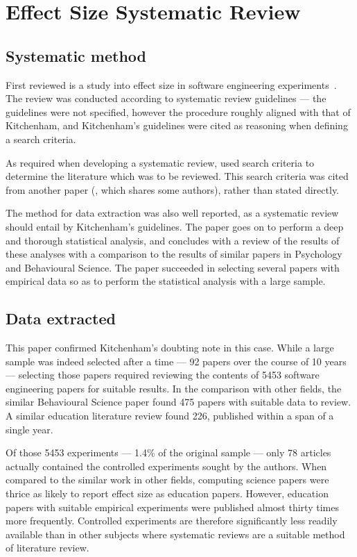 \section{Effect Size Systematic Review}
\subsection{Systematic method}
First reviewed is a study into effect size in software engineering experiments~\citep{Kampenes2007}. The review was conducted according to systematic review guidelines --- the guidelines were not specified, however the procedure roughly aligned with that of Kitchenham, and Kitchenham's guidelines were cited as reasoning when defining a search criteria.\par

As required when developing a systematic review, \cite{Kampenes2007} used search criteria to determine the literature which was to be reviewed. This search criteria was cited from another paper (\cite{Sjoberg2005}, which shares some authors), rather than stated directly. \par

The method for data extraction was also well reported, as a systematic review should entail by Kitchenham's guidelines. The paper goes on to perform a deep and thorough statistical analysis, and concludes with a review of the results of these analyses with a comparison to the results of similar papers in Psychology and Behavioural Science. The paper succeeded in selecting several papers with empirical data so as to perform the statistical analysis with a large sample.\par

\subsection{Data extracted}
This paper confirmed Kitchenham's doubting note in this case. While a large sample was indeed selected after a time --- 92 papers over the course of 10 years --- selecting those papers required reviewing the contents of 5453 software engineering papers for suitable results. In the comparison with other fields, the similar Behavioural Science paper found 475 papers with suitable data to review. A similar education literature review found 226, published within a span of a single year.\par

Of those 5453 experiments --- 1.4\% of the original sample --- only 78 articles actually contained the controlled experiments sought by the authors. When compared to the similar work in other fields, computing science papers were thrice as likely to report effect size as education papers. However, education papers with suitable empirical experiments were published almost thirty times more frequently. Controlled experiments are therefore significantly less readily available than in other subjects where systematic reviews are a suitable method of literature review.\par

